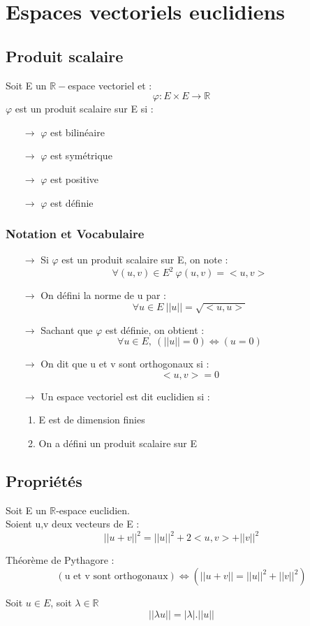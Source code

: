 
\chapter{Espaces vectoriels euclidiens}
\section{Produit scalaire}
\begin{de}
Soit E un $\mathbb{R}-$espace vectoriel et :
$$\varphi : E\times E \rightarrow \mathbb{R}$$
$\varphi$ est un produit scalaire sur E si :
\begin{itemize}
 \item[$\rightarrow$] $\varphi$ est bilinéaire
 \item[$\rightarrow$] $\varphi$ est symétrique
 \item[$\rightarrow$] $\varphi$ est positive
 \item[$\rightarrow$] $\varphi$ est définie
\end{itemize}
\end{de}
\subsection{Notation et Vocabulaire}
\begin{itemize}
\item[$\rightarrow$] Si $\varphi$ est un produit scalaire sur E, on note : $$\forall(u,v) \in E^2~ \varphi(u,v) = <u,v>$$
 \item[$\rightarrow$] On défini la norme de u par : $$\forall u \in E~ ||u|| = \sqrt{<u,u>}$$
 \item[$\rightarrow$] Sachant que $\varphi$ est définie, on obtient : $$\forall u \in E,~ (||u||=0) \Leftrightarrow (u=0)$$
 \item[$\rightarrow$] On dit que u et v sont orthogonaux si : $$<u,v>=0$$
 \item[$\rightarrow$] Un espace vectoriel est dit euclidien si : \begin{enumerate}[1-]
 \item E est de dimension finies 
 \item On a défini un produit scalaire sur E
\end{enumerate}
\end{itemize}
\section{Propriétés}
\begin{prop}
Soit E un $\mathbb{R}$-espace euclidien.\\
Soient u,v deux vecteurs de E : 
$$||u+v||^2 = ||u||^2 + 2<u,v> + ||v||^2$$
\end{prop}
\begin{theo}
Théorème de Pythagore : $$(\mbox{u et v sont orthogonaux}) \Leftrightarrow (||u+v|| = ||u||^2+||v||^2)$$
\end{theo}
\begin{prop}
 Soit $u \in E$, soit $\lambda \in \mathbb{R}$
$$||\lambda u|| = |\lambda|.||u||$$
\end{prop}

